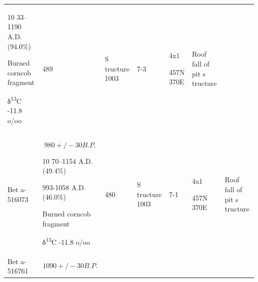 \documentclass[
  12pt,
]{krantz}
\begin{document}
\begin{longtable}[]{@{}lllllll@{}}
\begin{minipage}[t]{0.12\columnwidth}
10
33--1190
A.D.
(94.0\%)

Burned
corncob
fragment

δ\textsuperscript{13}C
-11.8
o/oo\strut
\end{minipage} & \begin{minipage}[t]{0.07\columnwidth}\raggedright
489\strut
\end{minipage} & \begin{minipage}[t]{0.12\columnwidth}\raggedright
S
tructure
1003\strut
\end{minipage} & \begin{minipage}[t]{0.08\columnwidth}\raggedright
7-3\strut
\end{minipage} & \begin{minipage}[t]{0.12\columnwidth}\raggedright
4x1

457N
370E\strut
\end{minipage} & \begin{minipage}[t]{0.12\columnwidth}\raggedright
Roof
fall of
pit
s
tructure\strut
\end{minipage}\tabularnewline
\begin{minipage}[t]{0.12\columnwidth}\raggedright
Bet
a-516073\strut
\end{minipage} & \begin{minipage}[t]{0.12\columnwidth}\raggedright
\[980
+/- 30
B.P.\]

10
70--1154
A.D.
(49.4\%)

993-1058
A.D.
(46.0\%)

Burned
corncob
fragment

δ\textsuperscript{13}C
-11.8
o/oo\strut
\end{minipage} & \begin{minipage}[t]{0.07\columnwidth}\raggedright
480\strut
\end{minipage} & \begin{minipage}[t]{0.12\columnwidth}\raggedright
S
tructure
1003\strut
\end{minipage} & \begin{minipage}[t]{0.08\columnwidth}\raggedright
7-1\strut
\end{minipage} & \begin{minipage}[t]{0.12\columnwidth}\raggedright
4x1

457N
370E\strut
\end{minipage} & \begin{minipage}[t]{0.12\columnwidth}\raggedright
Roof
fall of
pit
s
tructure\strut
\end{minipage}\tabularnewline
\begin{minipage}[t]{0.12\columnwidth}\raggedright
Bet
a-516761\strut
\end{minipage} & \begin{minipage}[t]{0.12\columnwidth}\raggedright
\[1090
+/- 30
B.P.\]


\end{minipage}
\end{longtable}
\end{document}
